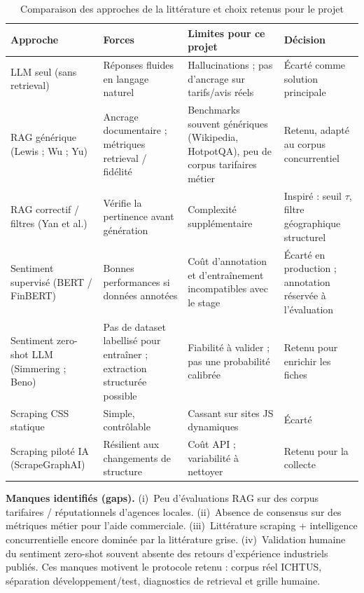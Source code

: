 \begin{table}[H]
\centering
\begingroup
{}
\small
\begin{tabularx}{\textwidth}{|p{2.6cm}|p{2.8cm}|p{3.2cm}|X|}
\hline
\textbf{Approche} & \textbf{Forces} & \textbf{Limites pour ce projet} & \textbf{Décision} \\
\hline
LLM seul (sans retrieval)
& Réponses fluides en langage naturel
& Hallucinations ; pas d'ancrage sur tarifs/avis réels
& Écarté comme solution principale \\
\hline
RAG générique (Lewis ; Wu ; Yu)
& Ancrage documentaire ; métriques retrieval / fidélité
& Benchmarks souvent génériques (Wikipedia, HotpotQA), peu de corpus tarifaires métier
& Retenu, adapté au corpus concurrentiel \\
\hline
RAG correctif / filtres (Yan et al.)
& Vérifie la pertinence avant génération
& Complexité supplémentaire
& Inspiré : seuil $\tau$, filtre géographique structurel \\
\hline
Sentiment supervisé (BERT / FinBERT)
& Bonnes performances si données annotées
& Coût d'annotation et d'entraînement incompatibles avec le stage
& Écarté en production ; annotation réservée à l'évaluation \\
\hline
Sentiment zero-shot LLM (Simmering ; Beno)
& Pas de dataset labellisé pour entraîner ; extraction structurée possible
& Fiabilité à valider ; pas une probabilité calibrée
& Retenu pour enrichir les fiches \\
\hline
Scraping CSS statique
& Simple, contrôlable
& Cassant sur sites JS dynamiques
& Écarté \\
\hline
Scraping piloté IA (ScrapeGraphAI)
& Résilient aux changements de structure
& Coût API ; variabilité à nettoyer
& Retenu pour la collecte \\
\hline
\end{tabularx}
\endgroup
\caption{Comparaison des approches de la littérature et choix retenus pour le projet}
\label{tab:comparatif_etat_art}
\end{table}

\textbf{Manques identifiés (gaps).}
 (i)~Peu d'évaluations RAG sur des corpus tarifaires / réputationnels
d'agences locales. (ii)~Absence de consensus sur des métriques métier pour l'aide commerciale.
(iii)~Littérature scraping + intelligence concurrentielle encore dominée par la littérature grise.
(iv)~Validation humaine du sentiment zero-shot souvent absente des retours d'expérience industriels
publiés. Ces manques motivent le protocole retenu : corpus réel ICHTUS, séparation développement/test,
diagnostics de retrieval et grille humaine.


